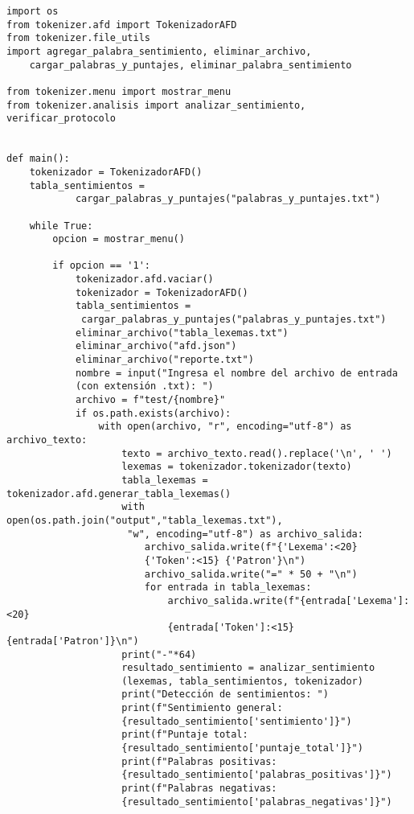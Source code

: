 \documentclass[12pt,a4paper]{scrartcl} %
\begin{document}
\begin{verbatim}
import os
from tokenizer.afd import TokenizadorAFD
from tokenizer.file_utils 
import agregar_palabra_sentimiento, eliminar_archivo,
    cargar_palabras_y_puntajes, eliminar_palabra_sentimiento

from tokenizer.menu import mostrar_menu
from tokenizer.analisis import analizar_sentimiento, verificar_protocolo


def main():
    tokenizador = TokenizadorAFD()
    tabla_sentimientos = 
            cargar_palabras_y_puntajes("palabras_y_puntajes.txt")

    while True:
        opcion = mostrar_menu()

        if opcion == '1':
            tokenizador.afd.vaciar() 
            tokenizador = TokenizadorAFD()
            tabla_sentimientos =
             cargar_palabras_y_puntajes("palabras_y_puntajes.txt")
            eliminar_archivo("tabla_lexemas.txt")
            eliminar_archivo("afd.json")
            eliminar_archivo("reporte.txt")
            nombre = input("Ingresa el nombre del archivo de entrada 
            (con extensión .txt): ")
            archivo = f"test/{nombre}"
            if os.path.exists(archivo):
                with open(archivo, "r", encoding="utf-8") as archivo_texto:
                    texto = archivo_texto.read().replace('\n', ' ')                    
                    lexemas = tokenizador.tokenizador(texto)
                    tabla_lexemas = tokenizador.afd.generar_tabla_lexemas()
                    with open(os.path.join("output","tabla_lexemas.txt"),
                     "w", encoding="utf-8") as archivo_salida:
                        archivo_salida.write(f"{'Lexema':<20} 
                        {'Token':<15} {'Patron'}\n")
                        archivo_salida.write("=" * 50 + "\n")
                        for entrada in tabla_lexemas:
                            archivo_salida.write(f"{entrada['Lexema']:<20} 
                            {entrada['Token']:<15} {entrada['Patron']}\n")
                    print("-"*64)
                    resultado_sentimiento = analizar_sentimiento
                    (lexemas, tabla_sentimientos, tokenizador)
                    print("Detección de sentimientos: ")
                    print(f"Sentimiento general: 
                    {resultado_sentimiento['sentimiento']}")
                    print(f"Puntaje total: 
                    {resultado_sentimiento['puntaje_total']}")
                    print(f"Palabras positivas: 
                    {resultado_sentimiento['palabras_positivas']}")
                    print(f"Palabras negativas: 
                    {resultado_sentimiento['palabras_negativas']}")


\end{verbatim}
\end{document}

